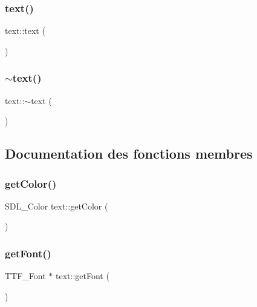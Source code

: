 \subsubsection{\texorpdfstring{text()}{text()}}
{\footnotesize\ttfamily text\+::text (\begin{DoxyParamCaption}{ }\end{DoxyParamCaption})}

\mbox{\label{classtext_af8ef97c73999b22520a93bad9df8cb66}} 
\subsubsection{\texorpdfstring{$\sim$text()}{~text()}}
{\footnotesize\ttfamily text\+::$\sim$text (\begin{DoxyParamCaption}{ }\end{DoxyParamCaption})}



\subsection{Documentation des fonctions membres}
\mbox{\label{classtext_a95c99a1931e9fa63969c8b42f836b215}} 
\subsubsection{\texorpdfstring{get\+Color()}{getColor()}}
{\footnotesize\ttfamily S\+D\+L\+\_\+\+Color text\+::get\+Color (\begin{DoxyParamCaption}{ }\end{DoxyParamCaption})}

\mbox{\label{classtext_ae2dd2d35f124bcb078c1d02071b1a370}} 
\subsubsection{\texorpdfstring{get\+Font()}{getFont()}}
{\footnotesize\ttfamily T\+T\+F\+\_\+\+Font $\ast$ text\+::get\+Font (\begin{DoxyParamCaption}{ }\end{DoxyParamCaption})}

